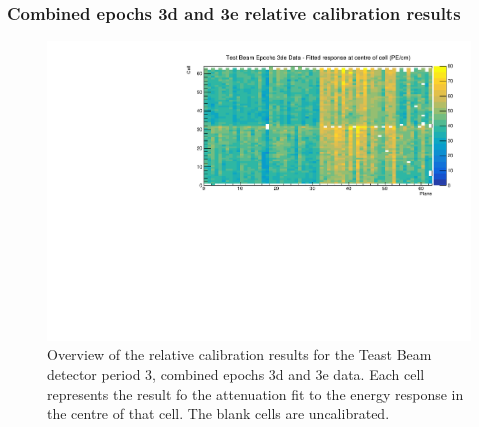 \documentclass[12pt,a4paper]{article}
\begin{document}
\subsubsection*{Combined epochs 3d and 3e relative calibration results}

\begin{figure}[!hbtp]
\centering
\includegraphics[width=\textwidth]{Plots/CellResponseAtCentre_epoch3de_Limited.pdf}
\caption{Overview of the relative calibration results for the Teast Beam detector period 3, combined epochs 3d and 3e data. Each cell represents the result fo the attenuation fit to the energy response in the centre of that cell. The blank cells are uncalibrated.}
\label{figCellCentreResponseEp3de}
\end{figure}
\end{document}

